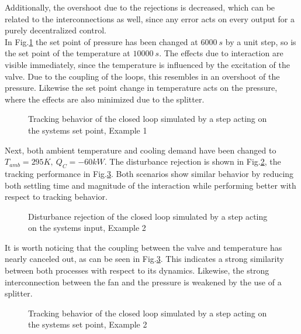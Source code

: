 Additionally, the overshoot due to the rejections is decreased, which can be related to the interconnections as well, since any error acts on every output for a purely decentralized control.\\

In Fig.\ref{c:physical:f:tracking1} the set point of pressure has been changed at $6000~s$ by a unit step, so is the set point of the temperature at $10000~s$. The effects due to interaction are visible immediately, since the temperature is influenced by the excitation of the valve. Due to the coupling of the loops, this resembles in an overshoot of the pressure. Likewise the set point change in temperature acts on the pressure, where the effects are also minimized due to the splitter.

\begin{figure}[H]

\caption{Tracking behavior of the closed loop simulated by a step acting on the systems set point, Example 1}
\label{c:physical:f:tracking1}
\end{figure}

Next, both ambient temperature and cooling demand have been changed to 
$T_{amb} = 295 K,~Q_C = -60 kW$. The disturbance rejection is shown in Fig.\ref{c:physical:f:disturbance2}, the tracking performance in Fig.\ref{c:physical:f:tracking2}. Both scenarios show similar behavior by reducing both settling time and magnitude of the interaction while performing better with respect to tracking behavior.

\begin{figure}[H]

\caption{Disturbance rejection of the closed loop simulated by a step acting on the systems input, Example 2}
\label{c:physical:f:disturbance2}
\end{figure}

It is worth noticing that the coupling between the valve and temperature has nearly canceled out, as can be seen in Fig.\ref{c:physical:f:tracking2}. This indicates a strong similarity between both processes with respect to its dynamics. Likewise, the strong interconnection between the fan and the pressure is weakened by the use of a splitter.

\begin{figure}[H]

\caption{Tracking behavior of the closed loop simulated by a step acting on the systems set point, Example 2}
\label{c:physical:f:tracking2}
\end{figure}

